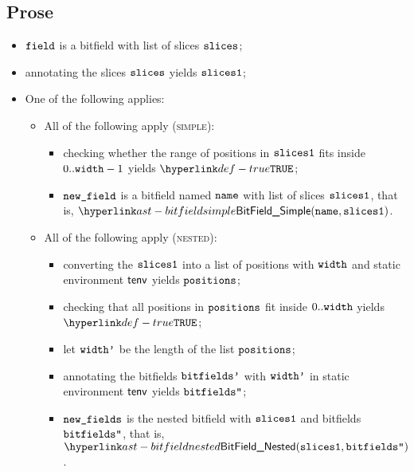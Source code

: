 \subsection{Prose}
\begin{itemize}
  \item $\texttt{field}$ is a bitfield with list of slices $\texttt{slices}$;
  \item annotating the slices $\texttt{slices}$ yields $\texttt{slices1}$\ProseOrTypeError;
  \item One of the following applies:
  \begin{itemize}
    \item All of the following apply (\textsc{simple}):
    \begin{itemize}
      \item checking whether the range of positions in $\texttt{slices1}$ fits inside $0..\texttt{width}-1$ yields $\True$\ProseOrTypeError;
      \item $\texttt{new\_field}$ is a bitfield named $\texttt{name}$ with list of slices $\texttt{slices1}$, that is, $\BitFieldSimple(\name, \slicesone)$.
    \end{itemize}

    \item All of the following apply (\textsc{nested}):
    \begin{itemize}
      \item converting the $\texttt{slices1}$ into a list of positions with $\texttt{width}$ and static environment $\textsf{tenv}$
      yields $\texttt{positions}$\ProseOrTypeError;
      \item checking that all positions in $\texttt{positions}$ fit inside $0..\texttt{width}$ yields \\
            $\True$\ProseOrTypeError;
      \item let $\texttt{width'}$ be the length of the list $\texttt{positions}$;
      \item annotating the bitfields $\texttt{bitfields'}$ with $\texttt{width'}$ in static environment $\textsf{tenv}$ yields $\texttt{bitfields''}$\ProseOrTypeError;
      \item $\texttt{new\_fields}$ is the nested bitfield with $\texttt{slices1}$ and bitfields $\texttt{bitfields''}$, that is, $\BitFieldNested(\slicesone, \bitfieldspp)$.
    \end{itemize}


\end{itemize}
\end{itemize}
